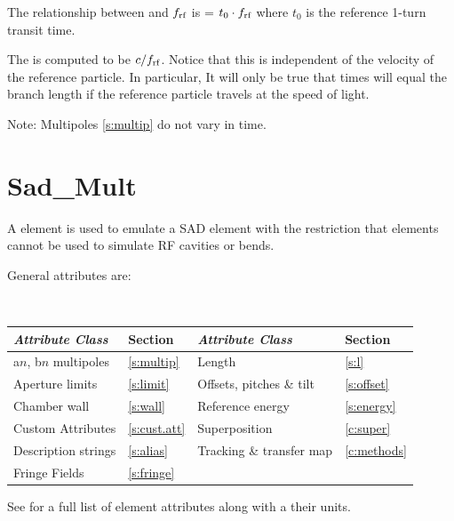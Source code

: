 {The relationship between  and $f_{\text{rf}}$ is 
 = $t_0 \cdot f_{\text{rf}}$ where $t_0$ is the reference 1-turn transit time.

The  is computed to be $c / f_{\text{rf}}$. Notice that this is independent of the
velocity of the reference particle. In particular, It will only be true that  times
 will equal the branch length if the reference particle travels at the speed of light.

Note: Multipoles \ref{s:multip} do not vary in time. 

\newpage

\section{Sad_Mult}
\label{s:sad.mult}

A  element is used to emulate a SAD\cite{b:sad}  element with the restriction
that  elements cannot be used to simulate RF cavities or bends.

General  attributes are:
\begin{center}
\tt
\begin{tabular}{llll} \toprule
  {\sl Attribute Class}      & Section           & {\sl Attribute Class}      & Section         \\ \midrule
  a$n$, b$n$ multipoles      & \ref{s:multip}    & Length                     & \ref{s:l}       \\
  Aperture limits            & \ref{s:limit}     & Offsets, pitches \& tilt   & \ref{s:offset}  \\
  Chamber wall               & \ref{s:wall}      & Reference energy           & \ref{s:energy}  \\ 
  Custom Attributes          & \ref{s:cust.att}  & Superposition              & \ref{c:super}   \\
  Description strings        & \ref{s:alias}     & Tracking \& transfer map   & \ref{c:methods} \\ 
  Fringe Fields              & \ref{s:fringe}    &                            &                 \\
  \bottomrule
\end{tabular}
\end{center}
\toffset
See  for a full list of element attributes along with a their units.

}
